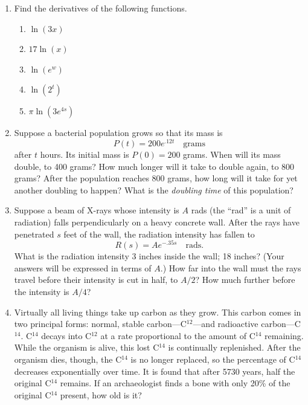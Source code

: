 \begin{enumerate}
\item Find the derivatives of the following functions.




  \begin{enumerate}
  \item $\ln(3x)$


  \item $17\ln(x)$


  \item $ \ln(e^{\displaystyle w})$


  \item $\ln(2^{\displaystyle t})$


  \item $\pi\ln(3e^{\displaystyle 4s})$


\end{enumerate}
\item Suppose a bacterial population grows so that its mass is
	\[
P(t) = 200e^{\displaystyle .12t} \quad \mbox{grams}
\]
after $t$ hours.  Its initial mass is $P(0) = 200$ grams.  
When will its mass double, to 400 grams?  How much longer 
will it take to double again, to 800 grams?  After the 
population reaches 800 grams, how long will it take for yet 
another doubling to happen?  What is the {\em doubling time} 
of this population?



\item Suppose a beam of X-rays whose intensity is $A$ rads (the ``rad'' is a unit of radiation) falls perpendicularly on a heavy concrete wall.  After the rays have penetrated $s$ feet of the wall, the radiation intensity has fallen to
	\[
R(s) = Ae^{\displaystyle -.35s} \quad \mbox{rads}.
\]
What is the radiation intensity 3 inches inside the wall; 18 inches?  (Your answers will be expressed in terms of $A$.) How far into the wall must the rays travel before their intensity is cut in half, to $A/2$?  How much further before the intensity is $A/4$?  


\item Virtually all living things take up carbon as they grow.  This
carbon comes in two principal forms: normal, stable
carbon---C$^{12}$---and radioactive carbon---C$^{14}$.  C$^{14}$
decays into C$^{12}$ at a rate proportional to the amount of C$^{14}$
remaining.  While the organism is alive, this lost C$^{14}$ is
continually replenished.  After the organism dies, though, the
C$^{14}$ is no longer replaced, so the percentage of C$^{14}$
decreases exponentially over time.  It is found that after 5730 years,
half the original C$^{14}$ remains.  If an archaeologist finds a bone
with only 20\% of the original C$^{14}$ present, how old is it?



\end{enumerate}
